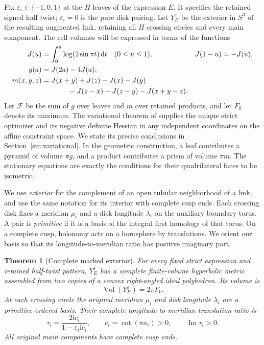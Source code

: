 \documentclass[11pt]{article}
\numberwithin{equation}{section}
\newtheorem{theorem}{Theorem}[section]
\theoremstyle{definition}\newtheorem{definition}[theorem]{Definition}
\theoremstyle{remark}\newtheorem{remark}[theorem]{Remark}
\newcommand{\ii}{\mathrm i}
\newcommand{\dd}{\mathrm d}
\newcommand{\Vol}{\operatorname{Vol}}
\newcommand{\Ima}{\operatorname{Im}}
\newcommand{\eps}{\varepsilon}
\begin{document}
Fix $\eps_i\in\{-1,0,1\}$ at the $H$ leaves of the expression $E$. It specifies
the retained signed half twist; $\eps_i=0$ is the pure disk pairing.
Let $Y_E^\eps$ be the exterior in $S^3$ of the resulting augmented
link, retaining all $H$ crossing circles and every main component.
The cell volumes will be expressed in terms of the functions
\begin{align}
 J(u)&=\int_0^u\log(2\sin\pi t)\,\dd t\quad(0\le u\le1),
       &J(1-u)&=-J(u),\label{sm:J}\\
 g(a)&=J(2a)-4J(a),\label{sm:g}\\
 m(x,y,z)&=J(x+y)+J(z)-J(x)-J(y)\notag\\
 &\hspace{13mm}-J(z-x)-J(z-y)-J(x+y-z).\label{sm:m}
\end{align}
Let $\mathcal F$ be the sum of $g$ over leaves and $m$ over retained
products, and let $F_0$ denote its maximum. The variational theorem
of \cite{Newton} supplies the unique strict optimizer and its
negative definite Hessian in any independent coordinates on the affine
constraint space. We state its precise conclusions in
Section~\ref{sm:variational}. In the geometric construction, a leaf
contributes a pyramid of volume $\pi g$, and a product contributes a
prism of volume $\pi m$. The stationary equations are exactly the
conditions for their quadrilateral faces to be isometric.

We use \emph{exterior} for the complement of an open tubular
neighborhood of a link, and use the same notation for its interior
with complete cusp ends. Each crossing disk fixes a meridian
$\mu_i$ and a disk longitude $\lambda_i$ on the auxiliary boundary
torus. A pair is \emph{primitive} if it is a basis of the integral
first homology of that torus. On a complete cusp, holonomy acts on a
horosphere by translations. We orient our basis so that its
longitude-to-meridian ratio has positive imaginary part.

\begin{theorem}[Complete marked exterior]\label{sm:complete}
For every fixed strict expression and retained half-twist pattern,
$Y_E^\eps$ has a complete finite-volume hyperbolic metric assembled
from two copies of a convex right-angled ideal polyhedron. Its volume is
\begin{equation}\label{sm:complete-volume}
                     \Vol(Y_E^\eps)=2\pi F_0.
\end{equation}
At each crossing circle the original meridian $\mu_i$ and disk
longitude $\lambda_i$ are a primitive ordered basis. Their complete
longitude-to-meridian translation ratio is
\begin{equation}\label{sm:tau}
 \tau_i=\frac{2\ii c_i}{1-\eps_i\ii c_i},\qquad
 c_i=\cot(\pi a_i)>0,\qquad \Ima\tau_i>0.
\end{equation}
All original main components have complete cusp ends.
\end{theorem}
\end{document}
